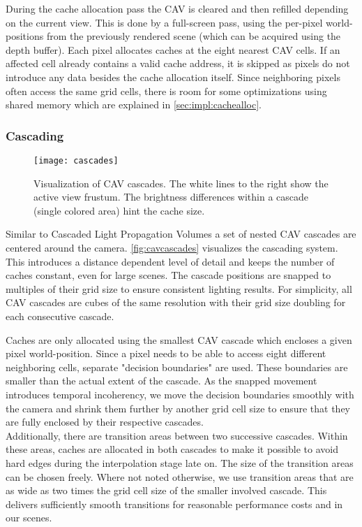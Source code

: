 \documentclass[thesis.tex]{subfiles}
\begin{document}
During the cache allocation pass the CAV is cleared and then refilled depending on the current view.
This is done by a full-screen pass, using the per-pixel world-positions from the previously rendered scene (which can be acquired using the depth buffer).
Each pixel allocates caches at the eight nearest CAV cells.
If an affected cell already contains a valid cache address, it is skipped as pixels do not introduce any data besides the cache allocation itself.
Since neighboring pixels often access the same grid cells, there is room for some optimizations using shared memory which are explained in \autoref{sec:impl:cachealloc}.

\subsubsection{Cascading} \label{sec:impl:cavcascading}
\begin{figure}[h]
	\centering
	\texttt{[image: cascades]}
	\caption{Visualization of CAV cascades. The white lines to the right show the active view frustum. The brightness differences within a cascade (single colored area) hint the cache size.} \label{fig:cavcascades}
\end{figure}

Similar to Cascaded Light Propagation Volumes \cite{bib:lpt} a set of nested CAV cascades are centered around the camera.
\autoref{fig:cavcascades} visualizes the cascading system.
This introduces a distance dependent level of detail and keeps the number of caches constant, even for large scenes.
The cascade positions are snapped to multiples of their grid size to ensure consistent lighting results. 
For simplicity, all CAV cascades are cubes of the same resolution with their grid size doubling for each consecutive cascade.

Caches are only allocated using the smallest CAV cascade which encloses a given pixel world-position.
Since a pixel needs to be able to access eight different neighboring cells, separate "decision boundaries" are used.
These boundaries are smaller than the actual extent of the cascade.
As the snapped movement introduces temporal incoherency, we move the decision boundaries smoothly with the camera and shrink them further by another grid cell size to ensure that they are fully enclosed by their respective cascades.\\
Additionally, there are transition areas between two successive cascades.
Within these areas, caches are allocated in both cascades to make it possible to avoid hard edges during the interpolation stage late on.
The size of the transition areas can be chosen freely.
Where not noted otherwise, we use transition areas that are as wide as two times the grid cell size of the smaller involved cascade.
This delivers sufficiently smooth transitions for reasonable performance costs and in our scenes.
\end{document}
